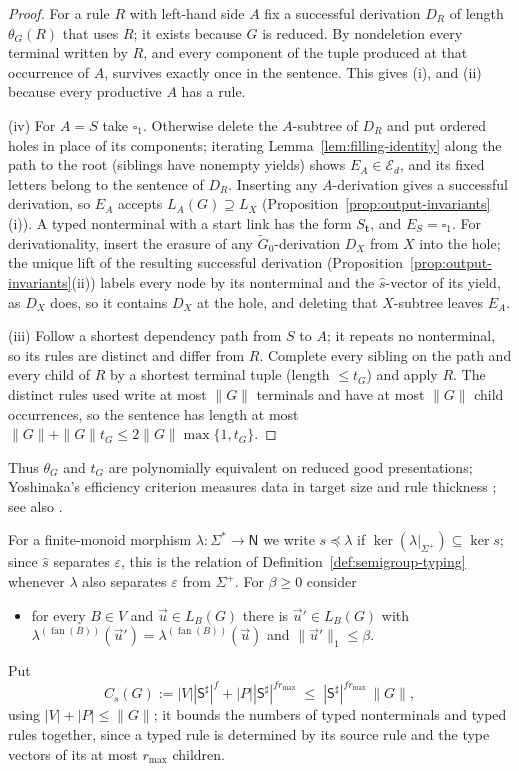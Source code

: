\documentclass[11pt]{article}
\numberwithin{equation}{section}
\theoremstyle{plain}
\theoremstyle{definition}
\theoremstyle{remark}
\newcommand{\tuple}[1]{\vec{#1}}
\newcommand{\blank}{\square}
\newcommand{\eps}{\varepsilon}
\newcommand{\fan}{\operatorname{fan}}
\begin{document}
\begin{proof}
For a rule $R$ with left-hand side $A$ fix a successful derivation $D_R$ of
length $\theta_G(R)$ that uses $R$; it exists because $G$ is reduced.  By
nondeletion every terminal written by $R$, and every component of the tuple
produced at that occurrence of $A$, survives exactly once in the sentence.  This
gives (i), and (ii) because every productive $A$ has a rule.

(iv) For $A=S$ take $\blank_1$.  Otherwise delete the $A$-subtree of $D_R$ and
put ordered holes in place of its components; iterating
Lemma~\ref{lem:filling-identity} along the path to the root (siblings have
nonempty yields) shows $E_A\in\mathcal E_d$, and its fixed letters belong to the
sentence of $D_R$.  Inserting any $A$-derivation gives a successful derivation,
so $E_A$ accepts $L_A(G)\supseteq L_X$
(Proposition~\ref{prop:output-invariants}(i)).  A typed nonterminal with a start
link has the form $S_{\mathbf t}$, and $E_S=\blank_1$.  For derivationality,
insert the erasure of any $\widetilde G_0$-derivation $D_X$ from $X$ into the
hole; the unique lift of the resulting successful derivation
(Proposition~\ref{prop:output-invariants}(ii)) labels every node by its
nonterminal and the $\widehat s$-vector of its yield, as $D_X$ does, so it contains
$D_X$ at the hole, and deleting that $X$-subtree leaves $E_A$.

(iii) Follow a shortest dependency path from $S$ to $A$; it repeats no
nonterminal, so its rules are distinct and differ from $R$.  Complete every
sibling on the path and every child of $R$ by a shortest terminal tuple (length
$\le t_G$) and apply $R$.  The distinct rules used write at most $\|G\|$
terminals and have at most $\|G\|$ child occurrences, so the sentence has length
at most $\|G\|+\|G\|t_G\le2\|G\|\max\{1,t_G\}$.
\end{proof}

Thus $\theta_G$ and $t_G$ are polynomially equivalent on reduced good
presentations; Yoshinaka's efficiency criterion measures data in target size and
rule thickness \cite[Definition~1]{Yoshinaka2011}; see also
\cite{EyraudHeinzYoshinaka2016}.

For a finite-monoid morphism $\lambda:\Sigma^*\to\mathsf N$ we write $s\preceq\lambda$
if $\ker(\lambda|_{\Sigma^+})\subseteq\ker s$; since $\widehat s$ separates $\eps$,
this is the relation of Definition~\ref{def:semigroup-typing} whenever $\lambda$
also separates $\eps$ from $\Sigma^+$.  For $\beta\ge0$ consider
\begin{itemize}[leftmargin=4em]
\item[$(\mathrm R_\beta^\lambda)$] for every $B\in V$ and $\tuple u\in L_B(G)$
there is $\tuple u'\in L_B(G)$ with
$\lambda^{(\fan(B))}(\tuple u')=\lambda^{(\fan(B))}(\tuple u)$ and
$\|\tuple u'\|_1\le\beta$.
\end{itemize}
Put
\[
 C_s(G):=|V||\mathsf S^\sharp|^f+|P||\mathsf S^\sharp|^{fr_{\max}}
 \;\le\;|\mathsf S^\sharp|^{fr_{\max}}\,\|G\|,
\]
using $|V|+|P|\le\|G\|$; it bounds the numbers of typed nonterminals and typed
rules together, since a typed rule is determined by its source rule and the type
vectors of its at most $r_{\max}$ children.
\end{document}

